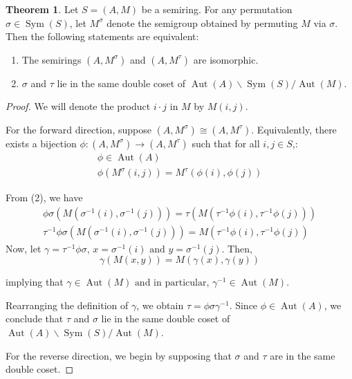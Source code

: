 \documentclass{article}
\theoremstyle{definition}
\newtheorem{theorem}{Theorem}
\begin{document}
\begin{theorem}
    Let \(S = (A, M)\) be a semiring. For any permutation \(\sigma \in \operatorname{Sym}(S)\), let \(M^\sigma\) denote the semigroup obtained by permuting \(M\) via \(\sigma\). Then the following statements are equivalent:
    \begin{enumerate}
        \item The semirings \((A, M^\sigma)\) and \((A, M^\tau)\) are isomorphic.
        \item \(\sigma\) and \(\tau\) lie in the same double coset of \(\operatorname{Aut}(A) \backslash \operatorname{Sym}(S) / \operatorname{Aut}(M)\).
    \end{enumerate}
\begin{proof}
    We will denote the product \(i\cdot j\) in \(M\) by \(M(i,j)\).

    For the forward direction, suppose \((A, M^\sigma) \cong (A, M^\tau)\). Equivalently, there exists a bijection \(\phi: (A, M^\sigma) \to (A, M^\tau)\) such that for all \(i, j \in S\),:
    \begin{gather}
         \phi \in \operatorname{Aut}(A)\\
         \phi(M^\sigma(i,j)) = M^\tau(\phi(i),\phi(j))
    \end{gather}

    From (2), we have
    \begin{gather*}
        \phi\sigma(M(\sigma^{-1}(i), \sigma^{-1}(j))) = \tau(M(\tau^{-1}\phi(i), \tau^{-1}\phi(j))) \\
        \tau^{-1}\phi\sigma(M(\sigma^{-1}(i), \sigma^{-1}(j))) = M(\tau^{-1}\phi(i), \tau^{-1}\phi(j))
    \end{gather*}
    Now, let \(\gamma = \tau^{-1}\phi\sigma\), \(x = \sigma^{-1}(i)\text{ and }y=\sigma^{-1}(j)\). Then,
    \[
        \gamma(M(x, y)) = M(\gamma(x), \gamma(y))
    \]

    implying that \(\gamma \in \operatorname{Aut}(M) \text{ and in particular, } \gamma^{-1} \in \operatorname{Aut}(M)\). 
    
    Rearranging the definition of \(\gamma\), we obtain \(\tau = \phi\sigma\gamma^{-1}\). Since \(\phi \in \operatorname{Aut}(A)\), we conclude that \(\tau\) and \(\sigma\) lie in the same double coset of \(\operatorname{Aut}(A) \backslash \operatorname{Sym}(S) / \operatorname{Aut}(M)\).

    \vspace{2em}
    For the reverse direction, we begin by supposing that \(\sigma\) and \(\tau\) are in the same double coset.


\end{proof}
\end{theorem}
\end{document}
